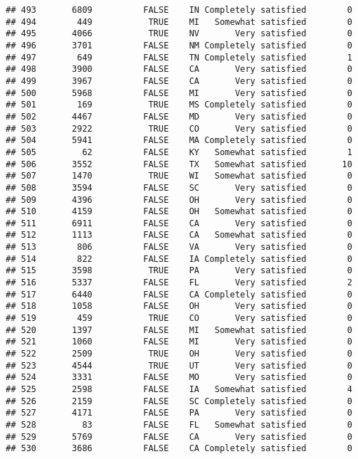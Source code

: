 \documentclass[]{book}
\theoremstyle{definition}
\theoremstyle{definition}
\theoremstyle{remark}
\begin{document}
\begin{verbatim}
## 493       6809          FALSE    IN Completely satisfied        0
## 494        449           TRUE    MI   Somewhat satisfied        0
## 495       4066           TRUE    NV       Very satisfied        0
## 496       3701          FALSE    NM Completely satisfied        0
## 497        649          FALSE    TN Completely satisfied        1
## 498       3900          FALSE    CA       Very satisfied        0
## 499       3967          FALSE    CA       Very satisfied        0
## 500       5968          FALSE    MI       Very satisfied        0
## 501        169           TRUE    MS Completely satisfied        0
## 502       4467          FALSE    MD       Very satisfied        0
## 503       2922           TRUE    CO       Very satisfied        0
## 504       5941          FALSE    MA Completely satisfied        0
## 505         62          FALSE    KY   Somewhat satisfied        1
## 506       3552          FALSE    TX   Somewhat satisfied       10
## 507       1470           TRUE    WI   Somewhat satisfied        0
## 508       3594          FALSE    SC       Very satisfied        0
## 509       4396          FALSE    OH       Very satisfied        0
## 510       4159          FALSE    OH   Somewhat satisfied        0
## 511       6911          FALSE    CA       Very satisfied        0
## 512       1113          FALSE    CA   Somewhat satisfied        0
## 513        806          FALSE    VA       Very satisfied        0
## 514        822          FALSE    IA Completely satisfied        0
## 515       3598           TRUE    PA       Very satisfied        0
## 516       5337          FALSE    FL       Very satisfied        2
## 517       6440          FALSE    CA Completely satisfied        0
## 518       1058          FALSE    OH       Very satisfied        0
## 519        459           TRUE    CO       Very satisfied        0
## 520       1397          FALSE    MI   Somewhat satisfied        0
## 521       1060          FALSE    MI       Very satisfied        0
## 522       2509           TRUE    OH       Very satisfied        0
## 523       4544           TRUE    UT       Very satisfied        0
## 524       3331          FALSE    MO       Very satisfied        0
## 525       2598          FALSE    IA   Somewhat satisfied        4
## 526       2159          FALSE    SC Completely satisfied        0
## 527       4171          FALSE    PA       Very satisfied        0
## 528         83          FALSE    FL   Somewhat satisfied        0
## 529       5769          FALSE    CA       Very satisfied        0
## 530       3686          FALSE    CA Completely satisfied        0

\end{verbatim}
\end{document}
